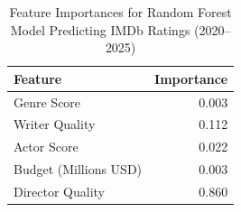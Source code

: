 \begin{table}
\caption{Feature Importances for Random Forest Model Predicting IMDb Ratings (2020--2025)}
\label{tab:rf_feature_importances}
\begin{tabular}{lr}
\toprule
Feature & Importance \\
\midrule
Genre Score & 0.003 \\
Writer Quality & 0.112 \\
Actor Score & 0.022 \\
Budget (Millions USD) & 0.003 \\
Director Quality & 0.860 \\
\bottomrule
\end{tabular}
\end{table}
